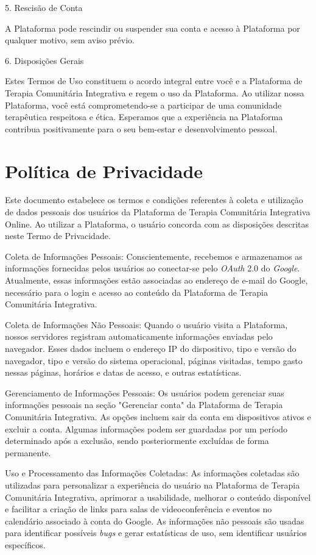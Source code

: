 \begin{apendicesenv}
        5. Rescisão de Conta
        
        A Plataforma pode rescindir ou suspender sua conta e acesso à Plataforma por qualquer motivo, sem aviso prévio.
        
        6. Disposições Gerais
        
        Estes Termos de Uso constituem o acordo integral entre você e a Plataforma de Terapia Comunitária Integrativa e regem o uso da Plataforma. Ao utilizar nossa Plataforma, você está comprometendo-se a participar de uma comunidade terapêutica respeitosa e ética. Esperamos que a experiência na Plataforma contribua positivamente para o seu bem-estar e desenvolvimento pessoal.

    \chapter{{P}olítica de Privacidade}
    \label{appendix:privacidade}
        Este documento estabelece os termos e condições referentes à coleta e utilização de dados pessoais dos usuários da Plataforma de Terapia Comunitária Integrativa Online. Ao utilizar a Plataforma, o usuário concorda com as disposições descritas neste Termo de Privacidade.
    
        Coleta de Informações Pessoais:
        Conscientemente, recebemos e armazenamos as informações fornecidas pelos usuários ao conectar-se pelo \textit{OAuth} 2.0 do \textit{Google}. Atualmente, essas informações estão associadas ao endereço de e-mail do Google, necessário para o login e acesso ao conteúdo da Plataforma de Terapia Comunitária Integrativa.
        
        Coleta de Informações Não Pessoais:
        Quando o usuário visita a Plataforma, nossos servidores registram automaticamente informações enviadas pelo navegador. Esses dados incluem o endereço IP do dispositivo, tipo e versão do navegador, tipo e versão do sistema operacional, páginas visitadas, tempo gasto nessas páginas, horários e datas de acesso, e outras estatísticas.
        
        Gerenciamento de Informações Pessoais:
        Os usuários podem gerenciar suas informações pessoais na seção "Gerenciar conta" da Plataforma de Terapia Comunitária Integrativa. As opções incluem sair da conta em dispositivos ativos e excluir a conta. Algumas informações podem ser guardadas por um período determinado após a exclusão, sendo posteriormente excluídas de forma permanente.
        
        Uso e Processamento das Informações Coletadas:
        As informações coletadas são utilizadas para personalizar a experiência do usuário na Plataforma de Terapia Comunitária Integrativa, aprimorar a usabilidade, melhorar o conteúdo disponível e facilitar a criação de links para salas de videoconferência e eventos no calendário associado à conta do Google. As informações não pessoais são usadas para identificar possíveis \textit{bugs} e gerar estatísticas de uso, sem identificar usuários específicos.
        

\end{apendicesenv}
